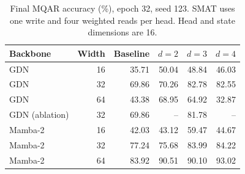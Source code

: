 \begin{table}[t]
\centering
\small
\caption{Final MQAR accuracy (\%), epoch 32, seed 123. SMAT uses one write and four weighted reads per head. Head and state dimensions are 16.}
\label{tab:mqar-gdn-mamba-all}
\begin{tabular}{lrrrrr}
\toprule
Backbone & Width & Baseline & $d=2$ & $d=3$ & $d=4$ \\
\midrule
GDN & 16 & 35.71 & 50.04 & 48.84 & 46.03 \\
GDN & 32 & 69.86 & 70.26 & 82.78 & 82.55 \\
GDN & 64 & 43.38 & 68.95 & 64.92 & 32.87 \\
\midrule
GDN (ablation) & 32 & 69.86 & -- & 81.78 & -- \\
\midrule
Mamba-2 & 16 & 42.03 & 43.12 & 59.47 & 44.67 \\
Mamba-2 & 32 & 77.24 & 75.68 & 83.99 & 84.22 \\
Mamba-2 & 64 & 83.92 & 90.51 & 90.10 & 93.02 \\
\bottomrule
\end{tabular}
\end{table}
